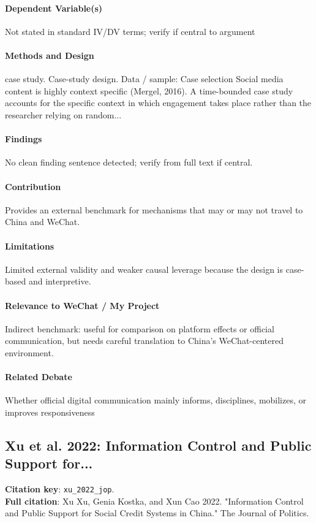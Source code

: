 \documentclass[12pt]{article}
\begin{document}
\paragraph{Dependent Variable(s)} Not stated in standard IV/DV terms; verify if central to argument

\paragraph{Methods and Design} case study. Case-study design. Data / sample: Case selection Social media content is highly context specific (Mergel, 2016). A time-bounded case study accounts for the specific context in which engagement takes place rather than the researcher relying on random...

\paragraph{Findings} No clean finding sentence detected; verify from full text if central.

\paragraph{Contribution} Provides an external benchmark for mechanisms that may or may not travel to China and WeChat.

\paragraph{Limitations} Limited external validity and weaker causal leverage because the design is case-based and interpretive.

\paragraph{Relevance to WeChat / My Project} Indirect benchmark: useful for comparison on platform effects or official communication, but needs careful translation to China's WeChat-centered environment.

\paragraph{Related Debate} Whether official digital communication mainly informs, disciplines, mobilizes, or improves responsiveness


\subsection{Xu et al. 2022: Information Control and Public Support for...}
\textbf{Citation key}: \texttt{xu\_2022\_jop}.\\
\textbf{Full citation}: Xu Xu, Genia Kostka, and Xun Cao 2022. "Information Control and Public Support for Social Credit Systems in China." The Journal of Politics.
\end{document}
